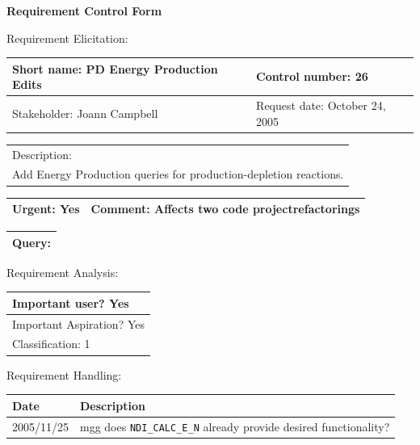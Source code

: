 \begin{center}\Large\bf
Requirement Control Form
\end{center}
\vspace{24pt}

Requirement Elicitation:

\begin{tabular}{|p{211pt}|p{211pt}|} \hline
Short name: PD Energy Production Edits & Control number: 26\\ \hline
Stakeholder: Joann Campbell & Request date: October 24, 2005\\
\end{tabular}
\begin{tabular}{|p{433pt}|} \hline
Description: \\ 
Add Energy Production queries for production-depletion reactions. \\
\hline
\end{tabular} 
\begin{tabular}{|p{211pt}|p{211pt}|} \hline
Urgent: Yes & Comment: Affects two code projectrefactorings\\ \hline
\end{tabular}

\vspace{12pt}

\begin{tabular}{|p{433pt}|} \hline
Query: \\ \hline
\end{tabular}
\vspace{24pt}

Requirement Analysis:

\begin{tabular}{|p{433pt}|} \hline
Important user? Yes \\ \hline
Important Aspiration? Yes \\ \hline
Classification: 1 \\ \hline
\end{tabular}
\vspace{24pt}

Requirement Handling:

\begin{tabular}{|p{72pt}|p{351pt}|} \hline
Date & Description \\ \hline
2005/11/25 & mgg does \texttt{NDI\_CALC\_E\_N} already provide desired
functionality? \\ \hline
\end{tabular}
